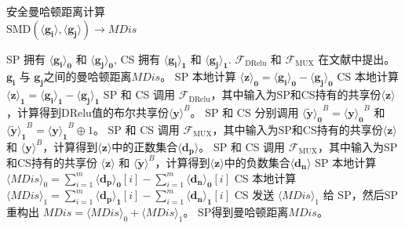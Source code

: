 \begin{algorithm}[htbp]
    \caption{安全曼哈顿距离计算\\$\text{SMD}(\boldsymbol{\langle g_i\rangle}, \boldsymbol{\langle g_j\rangle}) \xrightarrow{} \textit{MDis}$}
    \label{alg2}
    \begin{algorithmic}[1]
    \REQUIRE SP 拥有 $\boldsymbol{\langle g_i\rangle_0}$ 和 $\boldsymbol{\langle g_j\rangle_0}$, CS 拥有 $\boldsymbol{\langle g_i\rangle_1}$ 和 $\boldsymbol{\langle g_j\rangle_1}$. $\mathcal{F}_{\text {DRelu}}$ 和 $\mathcal{F}_{\text {MUX}}$ 在文献\cite{rathee2021sirnn}中提出。
    \ENSURE $\boldsymbol{g_i}$ 与 $\boldsymbol{g_j}$之间的曼哈顿距离$\textit{MDis}$。
    \STATE SP 本地计算 $\boldsymbol{\langle z\rangle_0} = \boldsymbol{\langle g_i\rangle_0} - \boldsymbol{\langle g_j\rangle_0}$
    \STATE CS 本地计算 $\boldsymbol{\langle z\rangle_1} = \boldsymbol{\langle g_i\rangle_1} - \boldsymbol{\langle g_j\rangle_1}$
    \STATE SP 和 CS 调用 $\mathcal{F}_{\text{DRelu}}$，其中输入为SP和CS持有的共享份$\boldsymbol{\langle z\rangle}$，计算得到DRelu值的布尔共享份$\boldsymbol{\langle y\rangle}^{B}$。
    \STATE SP 和 CS 分别调用 $\boldsymbol{\langle \widetilde{y} \rangle_0}^{B} = \boldsymbol{\langle y\rangle_0}^{B}$ 和 $\boldsymbol{\langle \widetilde{y} \rangle_1}^{B} = \boldsymbol{\langle y\rangle_1}^{B} \oplus 1$。
        \STATE SP 和 CS 调用 $\mathcal{F}_{\text{MUX}}$，其中输入为SP和CS持有的共享份$\boldsymbol{\langle z\rangle}$ 和 $\boldsymbol{\langle y\rangle}^{B}$，计算得到$\boldsymbol{\langle z\rangle}$中的正数集合$\boldsymbol{
        \langle d_p\rangle}$。
        \STATE SP 和 CS 调用 $\mathcal{F}_{\text{MUX}}$，其中输入为SP和CS持有的共享份 $\boldsymbol{\langle z\rangle}$ 和 $\boldsymbol{\langle \widetilde{y}\rangle}^{B}$，计算得到$\boldsymbol{\langle z\rangle}$中的负数集合$\boldsymbol{
        \langle d_n\rangle}$
    \STATE SP 本地计算 $\langle \textit{MDis}\rangle_0 = \sum_{i=1}^{m}\boldsymbol{\langle d_p\rangle_0}[i] - \sum_{i=1}^{m}\boldsymbol{\langle d_n\rangle_0}[i]$ 
    \STATE CS 本地计算 $\langle \textit{MDis}\rangle_1 = \sum_{i=1}^{m}\boldsymbol{\langle d_p\rangle_1}[i] - \sum_{i=1}^{m}\boldsymbol{\langle d_n\rangle_1}[i]$
    \STATE CS 发送 $\langle \textit{MDis}\rangle_1$ 给 SP，然后SP 重构出 $\textit{MDis} = \langle \textit{MDis}\rangle_0 + \langle \textit{MDis}\rangle_1$。
    \RETURN SP得到曼哈顿距离$\textit{MDis}$。
    \end{algorithmic}
\end{algorithm}

